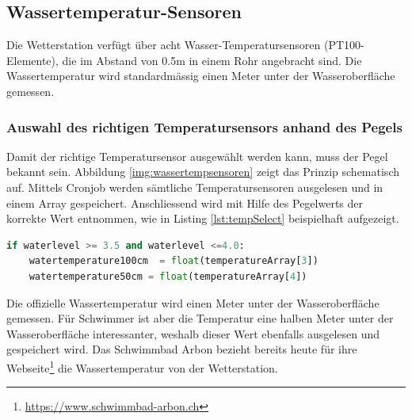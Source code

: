 \subsection{Wassertemperatur-Sensoren}
Die Wetterstation verfügt über acht Wasser-Temperatursensoren (PT100-Elemente), die im Abstand von 0.5m in einem Rohr angebracht sind. Die Wassertemperatur wird standardmässig einen Meter unter der Wasseroberfläche gemessen.

\subsubsection{Auswahl des richtigen Temperatursensors anhand des Pegels}
Damit der richtige Temperatursensor ausgewählt werden kann, muss der Pegel bekannt sein. Abbildung \ref{img:wassertempsensoren} zeigt das Prinzip schematisch auf. Mittels Cronjob werden sämtliche Temperatursensoren ausgelesen und in einem Array gespeichert. Anschliessend wird mit Hilfe des Pegelwerts der korrekte Wert entnommen, wie in Listing \ref{lst:tempSelect} beispielhaft aufgezeigt.

\begin{lstlisting}[label=lst:tempSelect,caption=Auswahl des richtigen Temperatursensors, language=Python, style=py]
if waterlevel >= 3.5 and waterlevel <=4.0:
    watertemperature100cm  = float(temperatureArray[3])
    watertemperature50cm = float(temperatureArray[4])
\end{lstlisting}

\noindent
Die offizielle Wassertemperatur wird einen Meter unter der Wasseroberfläche gemessen. Für Schwimmer ist aber die Temperatur eine halben Meter unter der Wasseroberfläche interessanter, weshalb dieser Wert ebenfalls ausgelesen und gespeichert wird. Das Schwimmbad Arbon bezieht bereits heute für ihre Webseite\footnote{\url{https://www.schwimmbad-arbon.ch}} die Wassertemperatur von der Wetterstation.


